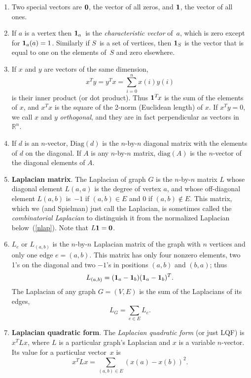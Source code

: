 \documentclass[11pt]{article}
\newcommand{\m}[1]{{\bf{#1}}}       %
\newcommand{\ones}{\m1}             %
\newcommand{\zeros}{\m0}            %
\newcommand{\diag}{\mbox{diag}}
\newcommand{\Diag}{\mbox{Diag}}
\newcommand{\Real}{\mathbb{R}}          %
\begin{document}
\begin{enumerate}
\item
Two special vectors are $\zeros$, the vector of all zeros,
and $\ones$, the vector of all ones.

\item
If $a$ is a vertex then $\ones_a$~is the 
{\em characteristic vector} of~$a$, which
is zero except for $\ones_a(a)=1$.
Similarly if $S$~is a set of vertices, 
then $\ones_S$ is the vector that is equal to one
on the elements of~$S$ and zero elsewhere.

\item
If $x$ and $y$ are vectors of the same dimension, 
$$x^Ty = y^Tx = \sum_{i=0}^{n}x(i)y(i)$$
is their inner product (or dot product).
Thus $\ones^T\!x$ is the sum of the elements of $x$,
and $x^Tx$ is the square of the 2-norm (Euclidean length) of $x$.
If $x^Ty=0$, we call $x$ and $y$ {\em orthogonal}, 
and they are in fact perpendicular as vectors in $\Real^n$.

\item
If $d$ is an $n$-vector, $\Diag(d)$ is the $n$-by-$n$ diagonal 
matrix with the elements of $d$ on the diagonal.
If $A$ is any $n$-by-$n$ matrix, $\diag(A)$ is the $n$-vector
of the diagonal elements of $A$.

\item\label{lap}{\bf Laplacian matrix}.
The Laplacian of graph $G$ is the $n$-by-$n$ matrix $L$
whose diagonal element $L(a,a)$ is the degree of vertex $a$, 
and whose off-diagonal element $L(a,b)$ is~$-1$ if $(a,b) \in E$ 
and $0$ if $(a,b) \notin E$.
This matrix, which we (and Spielman) just call the Laplacian,
is sometimes called the {\em combinatorial Laplacian} to 
distinguish it from the normalized Laplacian below~(\ref{nlap}).
Note that $ L\ones = \zeros$.

\item
$L_e$ or $L_{(a,b)}$ is the $n$-by-$n$ Laplacian matrix
of the graph with $n$ vertices and only one edge $e = (a,b)$.
This matrix has only four nonzero elements, two 1's on the
diagonal and two $-1$'s in positions $(a,b)$ and $(b,a)$;
thus 
$$L_{(a,b)}=(\ones_a-\ones_b)(\ones_a-\ones_b)^T.$$
The Laplacian of any graph $G=(V,E)$ is the sum of the Laplacians
of its edges,
$$L_G = \sum_{e\in E} L_e.$$

\item\label{LQF}{\bf Laplacian quadratic form}.
The {\em Laplacian quadratic form} (or just LQF) is $x^TLx$,
where $L$ is a particular graph's Laplacian and $x$ is a variable $n$-vector.
Its value for a particular vector~$x$ is 
$$x^TLx = \sum_{(a,b)\in E}(x(a)-x(b))^2.$$


\end{enumerate}
\end{document}
